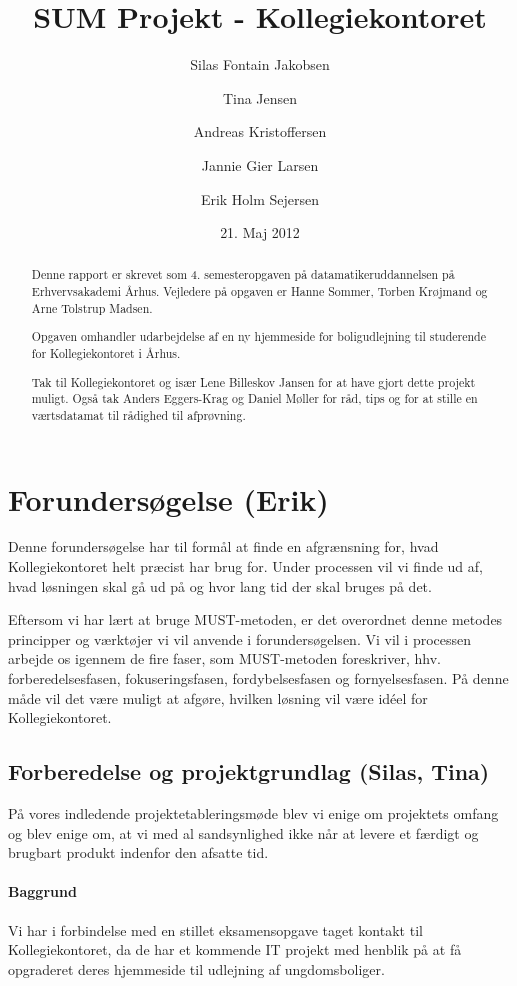 \documentclass[12pt, a4paper]{report}
\title{SUM Projekt - Kollegiekontoret}
\author{Silas Fontain Jakobsen \and Tina Jensen \and Andreas Kristoffersen \and Jannie Gier Larsen \and Erik Holm Sejersen}
\date{21. Maj 2012}
\begin{document}
\begin{titlepage}
\maketitle
\end{titlepage}

\renewcommand{\abstractname}{Forord}
\begin{abstract}
\thispagestyle{empty}
Denne rapport er skrevet som 4. semesteropgaven på datamatikeruddannelsen på Erhvervsakademi Århus. Vejledere på opgaven er Hanne Sommer, Torben Krøjmand og Arne Tolstrup Madsen.

Opgaven omhandler udarbejdelse af en ny hjemmeside for boligudlejning til studerende for Kollegiekontoret i Århus.

Tak til Kollegiekontoret og især Lene Billeskov Jansen for at have gjort dette projekt muligt. Også tak Anders Eggers-Krag og Daniel Møller for råd, tips og for at stille en værtsdatamat til rådighed til afprøvning.
\end{abstract}

\tableofcontents

\chapter{Forundersøgelse (Erik)}

Denne forundersøgelse har til formål at finde en afgrænsning for, hvad Kollegiekontoret helt præcist har brug for. Under processen vil vi finde ud af, hvad løsningen skal gå ud på og hvor lang tid der skal bruges på det.

Eftersom vi har lært at bruge MUST-metoden, er det overordnet denne metodes principper og værktøjer vi vil anvende i forundersøgelsen. Vi vil i processen arbejde os igennem de fire faser, som MUST-metoden foreskriver, hhv. forberedelsesfasen, fokuseringsfasen, fordybelsesfasen og fornyelsesfasen. På denne måde vil det være muligt at afgøre, hvilken løsning vil være idéel for Kollegiekontoret.

\section{Forberedelse og projektgrundlag (Silas, Tina)}
På vores indledende projektetableringsmøde blev vi enige om projektets omfang og blev enige om, at vi med al sandsynlighed ikke når at levere et færdigt og brugbart produkt indenfor den afsatte tid.

\subsubsection{Baggrund}
Vi har i forbindelse med en stillet eksamensopgave taget kontakt til Kollegiekontoret, da de har et kommende IT projekt med henblik på at få opgraderet deres hjemmeside til udlejning af ungdomsboliger.
\end{document}
